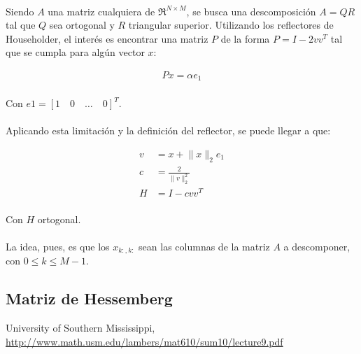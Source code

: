 \documentclass[12pt, twocolumn]{article}
\begin{document}
	\paragraph{} Siendo $A$ una matriz cualquiera de $\Re^{N\times M}$, se busca una descomposición $A = QR$ tal que $Q$ sea ortogonal y $R$ triangular superior. Utilizando los reflectores de Householder, el interés es encontrar una matriz $P$ de la forma $P = I - 2vv^{T}$ tal que se cumpla para algún vector $x$:
	
	\begin{align}
		Px = \alpha e_{1}
	\end{align}
	\paragraph{}Con $e1 = \left[1\quad0\quad\dots\quad0\right]^{T}$.
	
	\paragraph{} Aplicando esta limitación y la definición del reflector, se puede llegar a que:
	
	\begin{align}
		v &= x + \lVert x \rVert _{2}e_{1} \\
		c &= \frac{2}{\lVert v \rVert _{2}^{2}} \\
		H &= I - cvv^{T}
	\end{align}
	\paragraph{}Con $H$ ortogonal.
	
	\paragraph{} La idea, pues, es que los $x_{k:,k:}$ sean las columnas de la matriz $A$ a descomponer, con $ 0 \le k \le M-1$. 
	
	\subsection{Matriz de Hessemberg}
	
	\begin{thebibliography}{9}
	
		University of Southern Mississippi,
		\url{http://www.math.usm.edu/lambers/mat610/sum10/lecture9.pdf}
	
	\end{thebibliography}
	
\end{document}
